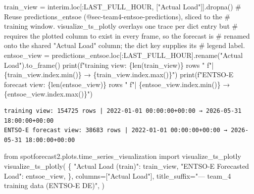 \documentclass[
  english,
  letterpaper,
]{scrbook}
\newenvironment{Shaded}{\begin{snugshade}}{\end{snugshade}}
\newcommand{\BuiltInTok}[1]{\textcolor[rgb]{0.00,0.23,0.31}{#1}}
\newcommand{\CommentTok}[1]{\textcolor[rgb]{0.37,0.37,0.37}{#1}}
\newcommand{\ImportTok}[1]{\textcolor[rgb]{0.00,0.46,0.62}{#1}}
\newcommand{\NormalTok}[1]{\textcolor[rgb]{0.00,0.23,0.31}{#1}}
\newcommand{\OperatorTok}[1]{\textcolor[rgb]{0.37,0.37,0.37}{#1}}
\newcommand{\SpecialCharTok}[1]{\textcolor[rgb]{0.37,0.37,0.37}{#1}}
\newcommand{\SpecialStringTok}[1]{\textcolor[rgb]{0.13,0.47,0.30}{#1}}
\newcommand{\StringTok}[1]{\textcolor[rgb]{0.13,0.47,0.30}{#1}}
\begin{document}
\protect{}\label{team4-training-data-print}
\begin{Shaded}
\begin{Highlighting}[]
\NormalTok{train\_view }\OperatorTok{=}\NormalTok{ interim.loc[:LAST\_FULL\_HOUR, [}\StringTok{"Actual Load"}\NormalTok{]].dropna()}
\CommentTok{\# Reuse predictions\_entsoe (@sec{-}team4{-}entsoe{-}predictions), sliced to the}
\CommentTok{\# training window. visualize\_ts\_plotly overlays one trace per dict entry but}
\CommentTok{\# requires the plotted column to exist in every frame, so the forecast is}
\CommentTok{\# renamed onto the shared "Actual Load" column; the dict key supplies its}
\CommentTok{\# legend label.}
\NormalTok{entsoe\_view }\OperatorTok{=}\NormalTok{ predictions\_entsoe.loc[:LAST\_FULL\_HOUR].rename(}\StringTok{"Actual Load"}\NormalTok{).to\_frame()}
\BuiltInTok{print}\NormalTok{(}\SpecialStringTok{f"training view: }\SpecialCharTok{\{}\BuiltInTok{len}\NormalTok{(train\_view)}\SpecialCharTok{\}}\SpecialStringTok{ rows "}
      \SpecialStringTok{f"| }\SpecialCharTok{\{}\NormalTok{train\_view}\SpecialCharTok{.}\NormalTok{index}\SpecialCharTok{.}\BuiltInTok{min}\NormalTok{()}\SpecialCharTok{\}}\SpecialStringTok{ → }\SpecialCharTok{\{}\NormalTok{train\_view}\SpecialCharTok{.}\NormalTok{index}\SpecialCharTok{.}\BuiltInTok{max}\NormalTok{()}\SpecialCharTok{\}}\SpecialStringTok{"}\NormalTok{)}
\BuiltInTok{print}\NormalTok{(}\SpecialStringTok{f"ENTSO{-}E forecast view: }\SpecialCharTok{\{}\BuiltInTok{len}\NormalTok{(entsoe\_view)}\SpecialCharTok{\}}\SpecialStringTok{ rows "}
      \SpecialStringTok{f"| }\SpecialCharTok{\{}\NormalTok{entsoe\_view}\SpecialCharTok{.}\NormalTok{index}\SpecialCharTok{.}\BuiltInTok{min}\NormalTok{()}\SpecialCharTok{\}}\SpecialStringTok{ → }\SpecialCharTok{\{}\NormalTok{entsoe\_view}\SpecialCharTok{.}\NormalTok{index}\SpecialCharTok{.}\BuiltInTok{max}\NormalTok{()}\SpecialCharTok{\}}\SpecialStringTok{"}\NormalTok{)}
\end{Highlighting}
\end{Shaded}

\begin{verbatim}
training view: 154725 rows | 2022-01-01 00:00:00+00:00 → 2026-05-31 18:00:00+00:00
ENTSO-E forecast view: 38683 rows | 2022-01-01 00:00:00+00:00 → 2026-05-31 18:00:00+00:00
\end{verbatim}

\begin{Shaded}
\begin{Highlighting}[]
\ImportTok{from}\NormalTok{ spotforecast2.plots.time\_series\_visualization }\ImportTok{import}\NormalTok{ visualize\_ts\_plotly}
\NormalTok{visualize\_ts\_plotly(}
\NormalTok{    \{}
        \StringTok{"Actual Load (train)"}\NormalTok{:      train\_view,}
        \StringTok{"ENTSO{-}E Forecasted Load"}\NormalTok{:  entsoe\_view,}
\NormalTok{    \},}
\NormalTok{    columns}\OperatorTok{=}\NormalTok{[}\StringTok{"Actual Load"}\NormalTok{],}
\NormalTok{    title\_suffix}\OperatorTok{=}\StringTok{"— team\_4 training data (ENTSO{-}E DE)"}\NormalTok{,}
\NormalTok{)}
\end{Highlighting}
\end{Shaded}
\end{document}
